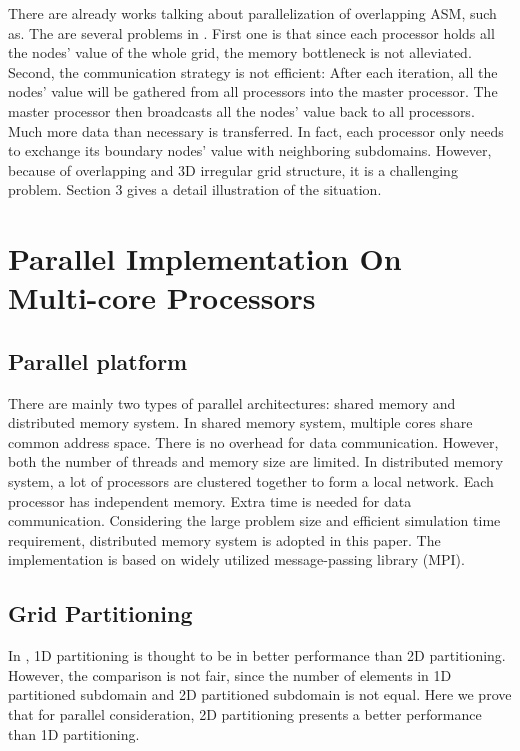 \documentclass{sig-alternate}
\begin{document}
	There are already works talking about parallelization of overlapping ASM, such as\cite{kaisun}. The are several problems in 
	\cite{kaisun}. First one is that since each processor holds all the nodes' value of the whole grid, the memory bottleneck
	is not alleviated. Second, the communication strategy is not efficient: After each iteration, all the
	nodes' value will be gathered from all processors into the master processor. The master processor then broadcasts all the nodes'
	value back to all processors. Much more
	data than necessary is transferred. In fact, each processor only needs to exchange its boundary nodes' value with neighboring 
	subdomains. However, because of overlapping and 3D irregular grid structure, it is a challenging problem. Section 3
	gives a detail illustration of the situation.
 
\section{Parallel Implementation On \\Multi-core Processors}
  \subsection{Parallel platform}
	There are mainly two types of parallel architectures: shared memory and distributed memory system. In shared 
	memory system, 
	multiple cores share common address space. There is no overhead for data communication. However, both the number
	of threads and memory size are limited. In distributed 
	memory system, a lot of processors are clustered together to form a local network. Each processor has independent memory. 
	Extra time is needed for data communication. Considering the large problem 
	size and efficient simulation time requirement, distributed memory system is adopted in this paper. The implementation is based
	on widely utilized message-passing library (MPI).
  \subsection{Grid Partitioning}
	In \cite{Zhongyu}, 1D partitioning is thought to be in better performance than 2D partitioning. However, the comparison is not 
	fair, since the number of elements in 1D partitioned subdomain and 2D partitioned subdomain is not equal. Here we prove that
	for parallel consideration, 2D partitioning presents a better performance than 1D partitioning. 
\end{document}
